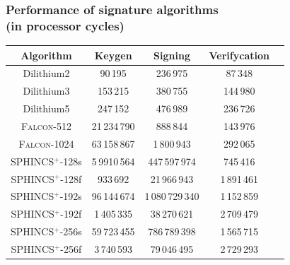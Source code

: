 \begin{frame}
    \frametitle{Performance of signature algorithms\\(in processor cycles)}
    \begin{table}[h]
    \centering
    \begin{tabular}[p]{| c | c | c | c | c |}
        \hline
        \textbf{Algorithm} & \textbf{Keygen} & \textbf{Signing} & \textbf{Verifycation}\\ \hline
        Dilithium2 & 90\,195 & 236\,975 & 87\,348 \\
        Dilithium3 & 153\,215 & 380\,755 & 144\,980 \\
        Dilithium5 & 247\,152 & 476\,989 & 236\,726 \\
        \hline
        \textsc{Falcon}-512 & 21\,234\,790 & 888\,844 & 143\,976 \\
        \textsc{Falcon}-1024 & 63\,158\,867 & 1\,800\,943 & 292\,065 \\
        \hline
        SPHINCS$^+$-128s & 5\,9910\,564 & 447\,597\,974 & 745\,416 \\
        SPHINCS$^+$-128f & 933\,692 & 21\,966\,943 & 1\,891\,461 \\
        SPHINCS$^+$-192s & 96\,144\,674 & 1\,080\,729\,340 & 1\,152\,859 \\
        SPHINCS$^+$-192f & 1\,405\,335 & 38\,270\,621 & 2\,709\,479 \\
        SPHINCS$^+$-256s & 59\,723\,455 & 786\,789\,398 & 1\,565\,715 \\
        SPHINCS$^+$-256f & 3\,740\,593 & 79\,046\,495 & 2\,729\,293 \\
        \hline
    \end{tabular}
    \end{table}
\end{frame}


